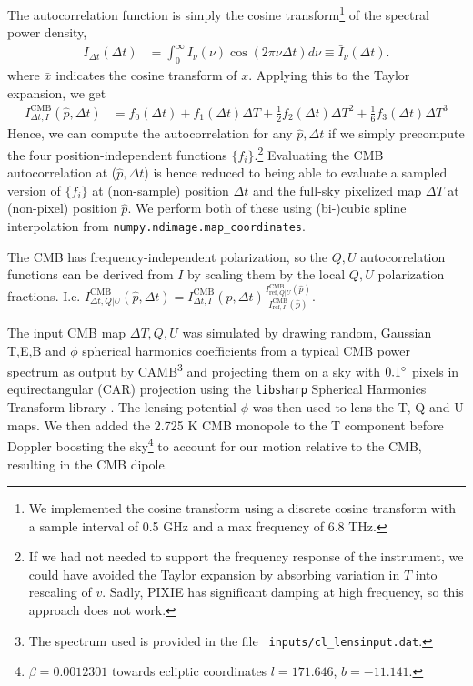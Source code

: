 \documentclass{article}
\newcommand{\code}[1]{\texttt{#1}}
\begin{document}
The autocorrelation function is simply the cosine transform\footnote{
We implemented the cosine transform using a discrete cosine transform with a
sample interval of 0.5 GHz and a max frequency of 6.8 THz.} of the spectral power
density,
\begin{align}
	I_{\Delta t}(\Delta t) &= \int_{0}^\infty I_\nu(\nu) \cos(2\pi\nu\Delta t) d\nu
	\equiv \bar I_\nu(\Delta t).
\end{align}
where $\bar{x}$ indicates the cosine transform of $x$.
Applying this to the Taylor expansion, we get
\begin{align}
I^\textrm{CMB}_{\Delta t,I}(\hat p,\Delta t) &= \bar f_0(\Delta t) + \bar f_1(\Delta t) \Delta T + \frac12 \bar f_2(\Delta t) \Delta T^2 + \frac16 \bar f_3(\Delta t) \Delta T^3
\end{align}
Hence, we can compute the autocorrelation for any $\hat p,\Delta t$ if we simply precompute
the four position-independent functions $\{f_i\}$.\footnote{
If we had not needed to support the frequency response of the instrument,
we could have avoided the Taylor expansion by absorbing variation in $T$
into rescaling of $v$. Sadly, PIXIE has significant damping at high frequency,
so this approach does not work.} Evaluating the CMB autocorrelation at ($\hat p,\Delta t$)
is hence reduced to being able to evaluate a sampled version of $\{f_i\}$
at (non-sample) position $\Delta t$ and
the full-sky pixelized map $\Delta T$ at (non-pixel) position $\hat p$.
We perform both of these using (bi-)cubic spline interpolation
from \code{numpy.ndimage.map\_coordinates}.

The CMB has frequency-independent polarization,
so the $Q,U$ autocorrelation functions can be derived from $I$ by scaling them by
the local $Q,U$ polarization fractions. I.e. $I^\textrm{CMB}_{\Delta t,Q|U}(\hat p,\Delta t) = I^\textrm{CMB}_{\Delta t,I}(\hat p,\Delta t) \frac{I^\textrm{CMB}_{\textrm{ref},Q|U}(\hat p)}{I^\textrm{CMB}_{\textrm{ref},I}(\hat p)}$.

The input CMB map $\Delta T,Q,U$ was simulated by drawing random, Gaussian
T,E,B and $\phi$ spherical harmonics coefficients from a typical CMB power spectrum
as output by CAMB\footnote{The spectrum used is provided in the file \code{
	inputs/cl\_lensinput.dat}.} and projecting them on a sky with $0.1\degree$
pixels in equirectangular (CAR) projection using the \code{libsharp} Spherical
Harmonics Transform library \citep{libsharp}. The lensing potential $\phi$ was then used to
lens the T, Q and U maps. We then added the 2.725 K CMB monopole to the T
component before Doppler boosting the sky\footnote{$\beta=0.0012301$ towards
ecliptic coordinates $l=171.646$, $b=-11.141$.}
to account for our motion relative to the CMB, resulting in the CMB dipole.
\end{document}
